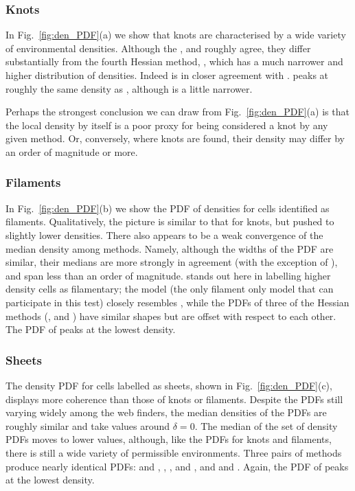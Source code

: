 \subsubsection{Knots} 
In Fig.~\ref{fig:den_PDF}(a) we show that knots are characterised by a wide variety of environmental densities. Although the \tweb{}, \vweb{} and \classic{} roughly agree, they differ substantially from the fourth Hessian method, \nexus{}, which has a much narrower and higher distribution of densities. Indeed \nexus{} is in closer agreement with \mswa{}. \origami{} peaks at roughly the same density as \vweb{}, although is a little narrower.

Perhaps the strongest conclusion we can draw from Fig.~\ref{fig:den_PDF}(a) is that the local density by itself is a poor proxy for being considered a knot by any given method. Or, conversely, where knots are found, their density may differ by an order of magnitude or more.

\subsubsection{Filaments} 
In Fig.~\ref{fig:den_PDF}(b) we show the PDF of densities for cells identified as filaments. Qualitatively, the picture is similar to that for knots, but pushed to slightly lower densities. There also appears to be a weak convergence of the median density among methods. Namely, although the widths of the PDF are similar, their medians are more strongly in agreement (with the exception of \mswa{}), and span less than an order of magnitude. \mswa{} stands out here in labelling higher density cells as filamentary; the \bisous{} model (the only filament only model that can participate in this test) closely resembles \origami{}, while the PDFs of three of the Hessian methods (\tweb{}, \vweb{} and \classic{}) have similar shapes but are offset with respect to each other. The PDF of \spine{} peaks at the lowest density.

\subsubsection{Sheets}
The density PDF for cells labelled as sheets, shown in Fig.~\ref{fig:den_PDF}(c), displays more coherence  than those of knots or filaments. Despite the PDFs still varying widely among the web finders, the median densities of the PDFs are roughly similar and take values around $\delta=0$.
The median of the set of density PDFs moves to lower values, although, like the PDFs for knots and filaments, there is still a wide variety of permissible environments. Three pairs of methods produce nearly identical PDFs: \nexus{} and \origami{}, \disperse{}, \tweb{}, and \mmft{}, and \vweb{} and \classic{}. Again, the PDF of \spine{} peaks at the lowest density.

